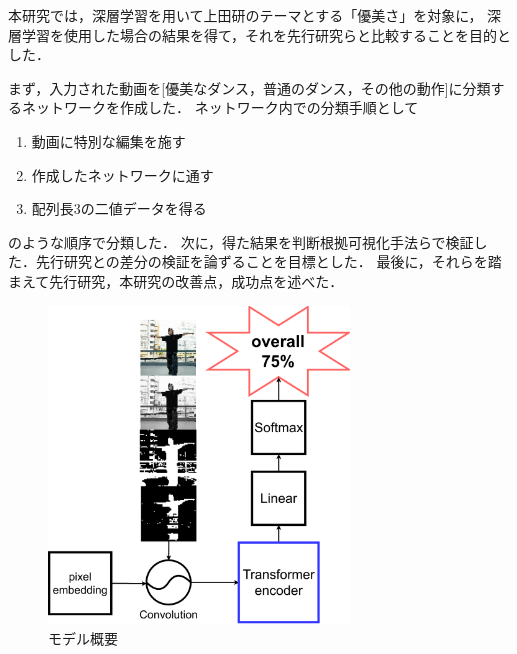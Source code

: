 本研究では，深層学習を用いて上田研のテーマとする「優美さ」を対象に，
深層学習を使用した場合の結果を得て，それを先行研究らと比較することを目的とした．

まず，入力された動画を[優美なダンス，普通のダンス，その他の動作]に分類するネットワークを作成した．
ネットワーク内での分類手順として
\begin{enumerate}
  \item 動画に特別な編集を施す
  \item 作成したネットワークに通す
  \item 配列長3の二値データを得る
\end{enumerate}
のような順序で分類した．
次に，得た結果を判断根拠可視化手法らで検証した．先行研究との差分の検証を論ずることを目標とした．
最後に，それらを踏まえて先行研究，本研究の改善点，成功点を述べた．

\begin{figure}[b]
  \begin{center}
    \includegraphics[width=80mm]{images/easy_chart.pdf}
  \end{center}
  \caption{モデル概要}
  \label{easy_chart}
\end{figure}